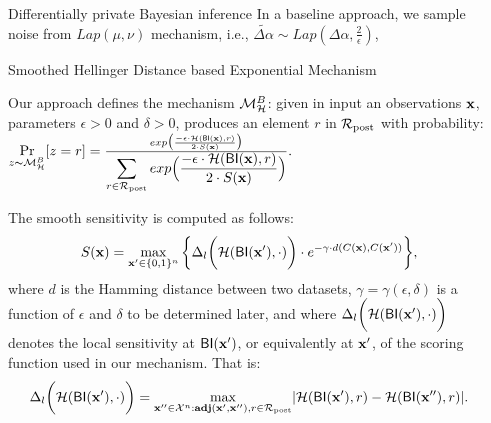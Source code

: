 \documentclass[final,hyperref={pdfpagelabels=false}]{beamer}
\begin{document}
\begin{frame}[t]
\begin{columns}[t]
\begin{column}{.485\textwidth}
\begin{block}{Differentially private Bayesian inference}
In a baseline approach, we sample noise from $Lap(\mu,\nu)$ mechanism, i.e., $\widetilde{\Delta \alpha}\sim Lap(\Delta \alpha, \frac{2}{\epsilon})$,

\end{block}



\begin{block}{Smoothed Hellinger Distance based Exponential Mechanism}

Our approach defines the mechanism $\mathcal{M}^{B}_{\mathcal{H}}$: given in input an observations $\textbf{x}$, parameters $\epsilon>0$ and $\delta>0$, produces an element $r$ in $\mathcal{R}_{\textup{post}}$ with probability:
$\underset{z \thicksim \mathcal{M}^{B}_{\mathcal{H}}}{\Pr}[z=r] = \frac {exp\big(\frac{-\epsilon\cdot\mathcal{H}(\mathsf{BI}(\textbf{x}),r)}{2\cdot S(\textbf{x})}\big)}
{\displaystyle\sum_{r\in\mathcal{R}_{\textup{post}}} exp\Big(\frac{-\epsilon\cdot\mathcal{H}(\mathsf{BI}(\textbf{x}),r)}{2\cdot S(\textbf{x})}\Big)}.$

The smooth sensitivity is
computed as follows:
\begin{equation*}
  \label{eq:smooth}
   S(\textbf{x})=\max_{\textbf{x}' \in \{0,1\}^{n}}\bigg \{\Delta_{l}\bigg (\mathcal{H}(\mathsf{BI}(\textbf{x}'),\cdot)\bigg )\cdot e^{-\gamma\cdot d(C(\textbf{x}), C(\textbf{x}'))}\bigg\},
\end{equation*}
where $d$ is the Hamming distance between two datasets,
$\gamma =
\gamma(\epsilon, \delta)$ is a function of $\epsilon$ and $\delta$ to
be determined later, and where $\Delta_{l}\bigg
(\mathcal{H}(\mathsf{BI}(\textbf{x}'),\cdot)\bigg )$ denotes the local
sensitivity at $\mathsf{BI}(\textbf{x}')$, or equivalently at $\textbf{x}'$,
of the scoring function used in our mechanism. That is:
\begin{equation*}
\Delta_{l}\bigg (\mathcal{H}(\mathsf{BI}(\textbf{x}'),\cdot)\bigg )=\max_{\textbf{x}'' \in \mathcal{X}^n:\textbf{adj}(\textbf{x}',\textbf{x}''), r\in \mathcal{R}_{\textup{post}}}\lvert \mathcal{H}(\mathsf{BI}(\textbf{x}'), r) - \mathcal{H}(\mathsf{BI}(\textbf{x}''), r)\rvert.
\end{equation*}


\end{block}


\end{column} %

\begin{column}{.01\textwidth}\end{column} %
 

\end{columns}
\end{frame}
\end{document}
